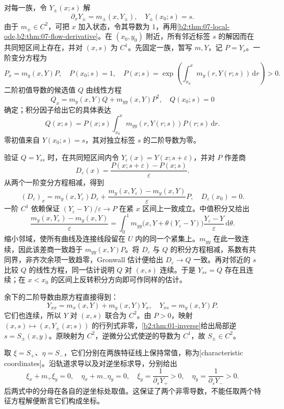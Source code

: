 对每一族，令 \(Y_\pm(x;s)\) 解
\[
 \partial_xY_\pm=m_\pm(x,Y_\pm),\quad Y_\pm(x_0;s)=s.
\]
由于 \(m_\pm\in C^2\)，可把 \(x\) 加入状态，令其导数为 \(1\)，再用\cref{b2:thm:07-local-ode,b2:thm:07-flow-derivative}。在 \((x_0,y_0)\) 附近，所有邻近标签 \(s\) 的解因而在共同短区间上存在，并对 \((x,s)\) 为 \(C^1\)。先固定一族，暂写 \(m,Y\)，记 \(P=Y_s\)。一阶变分方程为
\[
 P_x=m_y(x,Y)P,\quad P(x_0;s)=1,
 \quad
 P(x;s)=\exp\!\left(\int_{x_0}^x m_y(r,Y(r;s))\,\mathrm dr\right)>0.
\]
二阶初值导数的候选值 \(Q\) 由线性方程
\[
 Q_x=m_y(x,Y)Q+m_{yy}(x,Y)P^2,
 \quad Q(x_0;s)=0
\]
确定；积分因子给出它的具体表达
\[
 Q(x;s)=P(x;s)\int_{x_0}^x m_{yy}(r,Y(r;s))P(r;s)\,\mathrm dr.
\]
零初值来自 \(Y(x_0;s)=s\)，其对独立标签 \(s\) 的二阶导数为零。

验证 \(Q=Y_{ss}\) 时，在共同短区间内令 \(Y_\varepsilon(x)=Y(x;s+\varepsilon)\)，并对 \(P\) 作差商
\[
 D_\varepsilon(x)=\frac{P(x;s+\varepsilon)-P(x;s)}{\varepsilon}.
\]
从两个一阶变分方程相减，得到
\[
 (D_\varepsilon)_x
 =m_y(x,Y_\varepsilon)D_\varepsilon
  +\frac{m_y(x,Y_\varepsilon)-m_y(x,Y)}{\varepsilon}P,
 \quad D_\varepsilon(x_0)=0.
\]
一阶 \(C^1\) 依赖保证 \((Y_\varepsilon-Y)/\varepsilon\to P\) 在紧 \(x\) 区间上一致成立。中值积分又给出
\[
 \frac{m_y(x,Y_\varepsilon)-m_y(x,Y)}{\varepsilon}
 =\int_0^1m_{yy}\bigl(x,Y+\theta(Y_\varepsilon-Y)\bigr)
       \frac{Y_\varepsilon-Y}{\varepsilon}\,\mathrm d\theta.
\]
缩小邻域，使所有曲线及连接线段留在 \(U\) 内的同一个紧集上。\(m_{yy}\) 在此一致连续，因此该差商一致趋于 \(m_{yy}(x,Y)P\)。将 \(D_\varepsilon\) 与 \(Q\) 的积分方程相减，系数有共同界，非齐次余项一致趋零，Gronwall 估计便给出 \(D_\varepsilon\to Q\) 一致。再对邻近的 \(s\) 比较 \(Q\) 的线性方程，同一估计说明 \(Q\) 对 \((x,s)\) 连续。于是 \(Y_{ss}=Q\) 存在且连续；在 \(x<x_0\) 的区间上反转积分方向即可作同样的估计。

余下的二阶导数由原方程直接得到：
\[
 Y_{xx}=m_x(x,Y)+m_y(x,Y)Y_x,
 \quad Y_{xs}=m_y(x,Y)P.
\]
它们也连续，所以 \(Y\) 对 \((x,s)\) 联合为 \(C^2\)。由 \(P>0\)，映射 \((x,s)\mapsto(x,Y_\pm(x;s))\) 的行列式非零，\cref{b2:thm:01-inverse}给出局部逆 \(s=S_\pm(x,y)\)。原映射为 \(C^2\)，逆微分公式使逆的导数为 \(C^1\)，故 \(S_\pm\in C^2\)。

取 \(\xi=S_+\)、\(\eta=S_-\)，它们分别在两族特征线上保持常值，称为[characteristic coordinates]。沿轨道求导以及对逆坐标求导，分别给出
\[
 \xi_x+m_+\xi_y=0,\quad
 \eta_x+m_-\eta_y=0,\quad
 \xi_y=\frac1{\partial_sY_+}>0,\quad
 \eta_y=\frac1{\partial_sY_-}>0.
\]
后两式中的分母在各自的逆坐标处取值。这保证了两个非零导数，不能任取两个特征方程解便断言它们构成坐标。

